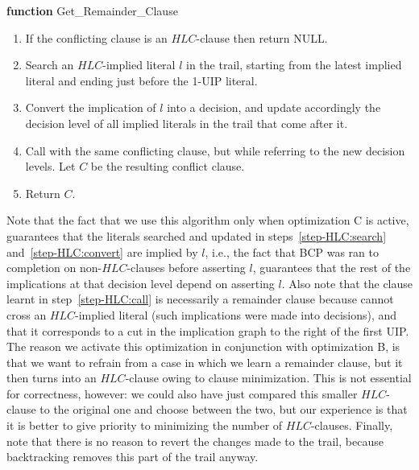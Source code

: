 \documentclass[twoside,11pt]{article}
\begin{document}
\begin{algorithm}\caption{An algorithm that attempts to find a remainder conflict clause by reanalyzing the conflict graph as if the $HLC$-implications were decisions. Returns a remainder clause if one can be found, and NULL otherwise.}
\label{alg:HLC}
{\bf function} {Get\_Remainder\_Clause}{}
\vspace{-0.3 cm}
\begin{enumerate}
\item If the conflicting clause is an $HLC$-clause then return NULL.
\item\label{step-HLC:search} Search an $HLC$-implied literal $l$ in the trail, starting from the latest implied
literal and ending just before the 1-UIP literal.

\item \label{step-HLC:convert}Convert the implication of $l$ into a decision, and update accordingly the
decision level of all implied literals in the trail that come after it.

\item \label{step-HLC:call}Call  with the same conflicting clause, but while referring to the new
decision levels. Let $C$ be the resulting conflict clause.

\item Return $C$.
\end{enumerate}
\vspace{-0.2 cm}
\end{algorithm}
%
Note that the fact that we use this algorithm only when optimization  C  is active, guarantees that the literals searched and updated in steps~\ref{step-HLC:search} and~\ref{step-HLC:convert} are implied by $l$, i.e., the fact that BCP was ran to completion on non-$HLC$-clauses before asserting $l$, guarantees that the rest of the implications at that decision level depend on asserting $l$. Also note that the clause learnt in step~\ref{step-HLC:call} is necessarily a remainder clause because  cannot cross an $HLC$-implied literal (such implications were made into decisions), and that it corresponds to a cut in the implication graph to the right of the first UIP. The reason we activate this optimization in conjunction with optimization  B, is that we want to refrain from a case in which we learn a remainder clause, but it then turns into an $HLC$-clause owing to clause minimization. This is not essential for correctness, however: we could also have just compared this smaller $HLC$-clause to the original one and choose between the two, but our experience is that it is better to give priority to minimizing the number of $HLC$-clauses. Finally, note that there is no reason to revert the changes made to the trail, because backtracking removes this part of the trail anyway.
\end{document}
